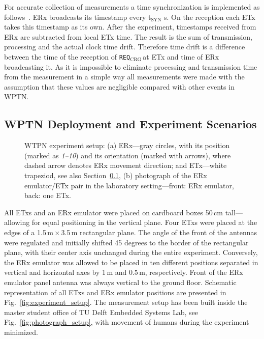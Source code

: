 \documentclass[11pt,draftclsnofoot,journal,onecolumn]{IEEEtran}
\newcommand{\textsubscript}[1]{$_{\text{#1}}$}
\newcommand{\chargingRequest}{\texttt{REQ\textsubscript{CRG}}\,}
\newcommand{\tSyn}{t\textsubscript{SYN}\,}
\begin{document}
For accurate collection of measurements a time synchronization is implemented as follows~\cite[Ch. 5]{golinski_msc_2015}. ERx broadcasts its timestamp every \tSyn\,s. On the reception each ETx takes this timestamp as its own. After the experiment, timestamps received from ERx are subtracted from local ETx time. The result is the sum of transmission, processing and the actual clock time drift. Therefore time drift is a difference between the time of the reception of \chargingRequest at ETx and time of ERx broadcasting it. As it is impossible to eliminate processing and transmission time from the measurement in a simple way all measurements were made with the assumption that these values are negligible compared with other events in WPTN.

\subsection{WPTN Deployment and Experiment Scenarios}
\label{sec:experiment_scenario}

\begin{figure}
\centering
{}
\caption{WTPN experiment setup: (a) ERx---gray circles, with its position (marked as \emph{1--10}) and its orientation (marked with arrows), where dashed arrow denotes ERx movement direction; and ETx---white trapeziod, see also Section~\ref{sec:experiment_scenario}, (b) photograph of the ERx emulator/ETx pair in the laboratory setting---front: ERx emulator, back: one ETx.}
\label{fig:wptn_setup}
\end{figure}

All ETxs and an ERx emulator were placed on cardboard boxes 50\,cm tall---allowing for equal positioning in the vertical plane. Four ETxs were placed at the edges of a 1.5\,m\,$\times$\,3.5\,m rectangular plane. The angle of the front of the antennas were regulated and initially shifted 45 degrees to the border of the rectangular plane, with their center axis unchanged during the entire experiment. Conversely, the ERx emulator was allowed to be placed in ten different positions separated in vertical and horizontal axes by 1\,m and 0.5\,m, respectively. Front of the ERx emulator panel antenna was always vertical to the ground floor. Schematic representation of all ETxs and ERx emulator positions are presented in Fig.~\ref{fig:experiment_setup}. The measurement setup has been built inside the master student office of TU Delft Embedded Systems Lab, see Fig.~\ref{fig:photograph_setup}, with movement of humans during the experiment minimized.
\end{document}
